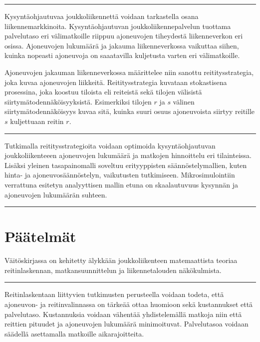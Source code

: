 \documentclass[a4paper,12pt]{article}
\newcommand*\sepline{%
  \begin{center}
    \rule[1ex]{.5\textwidth}{.5pt}
  \end{center}}
\begin{document}
\sepline

Kysyntäohjautuvaa joukkoliikennettä voidaan tarkastella osana liikennemarkkinoita. Kysyntäohjautuvan joukkoliikennepalvelun
tuottama palvelutaso eri välimatkoille riippuu ajoneuvojen tiheydestä liikenneverkon eri osissa.
Ajoneuvojen lukumäärä ja jakauma liikenneverkossa vaikuttaa siihen, kuinka nopeasti ajoneuvoja on 
saaatavilla kuljetusta varten eri välimatkoille.

Ajoneuvojen jakauman liikenneverkossa määrittelee niin sanottu reititysstrategia, joka kuvaa ajoneuvojen liikkeitä.
Reititysstrategia kuvataan stokastisena prosessina, joka koostuu tiloista eli reiteistä sekä tilojen välisistä
siirtymätodennäköisyyksistä. Esimerkiksi tilojen $r$ ja $s$ välinen siirtymätodennäköisyys kuvaa sitä, kuinka suuri osuus 
ajoneuvoista siirtyy reitille $s$ kuljettuaan reitin $r$.

\sepline

Tutkimalla reititysstrategioita voidaan optimoida kysyntäohjautuvan joukkoliikenteeen ajoneuvojen lukumäärä ja 
matkojen hinnoittelu eri tilainteissa. Lisäksi yleinen tasapainomalli soveltuu erityyppisten säännöstelymallien, 
kuten hinta- ja ajoneuvosäännöstelyn, vaikutusten tutkimiseen. Mikrosimulointiin verrattuna esitetyn analyyttisen mallin
etuna on skaalautuvuus kysynnän ja ajoneuvojen lukumäärän suhteen.

\sepline



\section*{Päätelmät}
Väitöskirjassa on kehitetty älykkään joukkoliikenteen matemaattista teoriaa reitinlaskennan, matkansuunnittelun ja
liikennetalouden näkökulmista.

\sepline

Reitinlaskentaan liittyvien tutkimusten perusteella voidaan todeta, että ajoneuvon- ja reitinvalinnassa on tärkeää 
ottaa huomioon sekä kustannukset että palvelutaso. Kustannuksia voidaan vähentää yhdistelemällä matkoja
niin että reittien pituudet ja ajoneuvojen lukumäärä minimoituvat. Palvelutasoa voidaan säädellä asettamalla 
matkoille aikarajoitteita.
\end{document}
